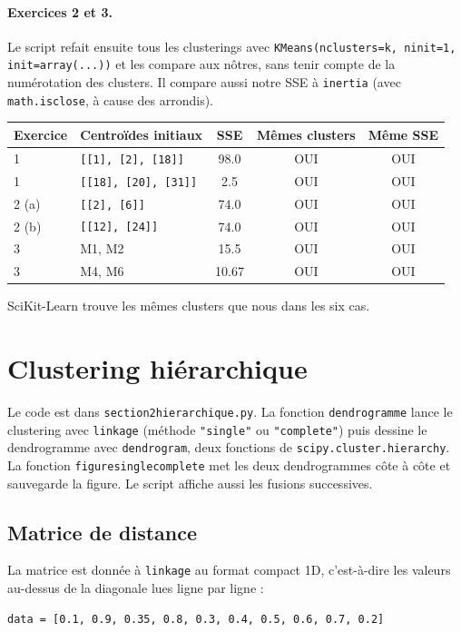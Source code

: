 \documentclass[11pt,a4paper]{article}
\renewcommand{\_}{\underscoreorig\allowbreak}
\begin{document}
\paragraph{Exercices 2 et 3.} Le script refait ensuite tous les clusterings avec \texttt{KMeans(n\_clusters=k, n\_init=1, init=array(...))} et les compare aux nôtres, sans tenir compte de la numérotation des clusters. Il compare aussi notre SSE à \texttt{inertia\_} (avec \texttt{math.isclose}, à cause des arrondis).
\begin{center}
\begin{tabular}{@{}llccc@{}}
  \toprule
  Exercice & Centroïdes initiaux & SSE & Mêmes clusters & Même SSE \\
  \midrule
  1 & \texttt{[[1], [2], [18]]}   & 98.0  & OUI & OUI \\
  1 & \texttt{[[18], [20], [31]]} & 2.5   & OUI & OUI \\
  2 (a) & \texttt{[[2], [6]]}     & 74.0  & OUI & OUI \\
  2 (b) & \texttt{[[12], [24]]}   & 74.0  & OUI & OUI \\
  3 & M1, M2                      & 15.5  & OUI & OUI \\
  3 & M4, M6                      & 10.67 & OUI & OUI \\
  \bottomrule
\end{tabular}
\end{center}
SciKit-Learn trouve les mêmes clusters que nous dans les six cas.

\section{Clustering hiérarchique}

Le code est dans \texttt{section2\_hierarchique.py}. La fonction \texttt{dendrogramme} lance le clustering avec \texttt{linkage} (méthode \texttt{"single"} ou \texttt{"complete"}) puis dessine le dendrogramme avec \texttt{dendrogram}, deux fonctions de \texttt{scipy.cluster.hierarchy}. La fonction \texttt{figure\_single\_complete} met les deux dendrogrammes côte à côte et sauvegarde la figure. Le script affiche aussi les fusions successives.

\subsection{Matrice de distance}

La matrice est donnée à \texttt{linkage} au format compact 1D, c'est-à-dire les valeurs au-dessus de la diagonale lues ligne par ligne :
\begin{lstlisting}
data = [0.1, 0.9, 0.35, 0.8, 0.3, 0.4, 0.5, 0.6, 0.7, 0.2]
\end{lstlisting}
\end{document}
